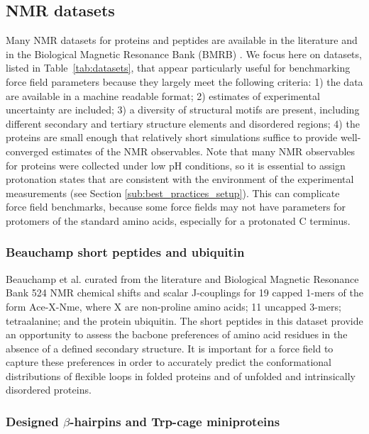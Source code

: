 \documentclass[9pt,review]{livecoms}
\begin{document}
\subsection{NMR datasets}
\label{sub:nmr_data}

Many NMR datasets for proteins and peptides are available in the literature and in the Biological Magnetic Resonance Bank (BMRB) \cite{ulrich_biomagresbank_2008,romero_biomagresbank_2020}.
We focus here on datasets, listed in Table~\ref{tab:datasets}, that appear particularly useful for benchmarking force field parameters because they largely meet the following criteria: 1) the data are available in a machine readable format; 2) estimates of experimental uncertainty are included; 3) a diversity of structural motifs are present, including different secondary and tertiary structure elements and disordered regions; 4) the proteins are small enough that relatively short simulations suffice to provide well-converged estimates of the NMR observables.
Note that many NMR observables for proteins were collected under low pH conditions, so it is essential to assign protonation states that are consistent with the environment of the experimental measurements (see Section \ref{sub:best_practices_setup}).
This can complicate force field benchmarks, because some force fields may not have parameters for protomers of the standard amino acids, especially for a protonated C terminus.

\subsubsection{Beauchamp short peptides and ubiquitin}
\label{sub2:beauchamp}

Beauchamp et al. \cite{beauchamp_are_2012} curated from the literature and Biological Magnetic Resonance Bank 524 NMR chemical shifts and scalar J-couplings for 19 capped 1-mers of the form Ace-X-Nme, where X are non-proline amino acids; 11 uncapped 3-mers; tetraalanine; and the protein ubiquitin.
The short peptides in this dataset provide an opportunity to assess the bacbone preferences of amino acid residues in the absence of a defined secondary structure.
It is important for a force field to capture these preferences in order to accurately predict the conformational distributions of flexible loops in folded proteins and of unfolded and intrinsically disordered proteins.

\subsubsection{Designed $\beta$-hairpins and Trp-cage miniproteins}
\label{sub2:designed_beta}
\end{document}
